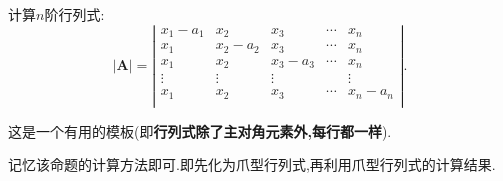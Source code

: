 \documentclass[../../main.tex]{subfiles}%
\begin{document}
\begin{corollary}\label{proposition:爪型行列式的推广}
计算$n$阶行列式:
\begin{equation}
|\boldsymbol{A}|=\left| \begin{matrix}
x_1-a_1&		x_2&		x_3&		\cdots&		x_n\\
x_1&		x_2-a_2&		x_3&		\cdots&		x_n\\
x_1&		x_2&		x_3-a_3&		\cdots&		x_n\\
\vdots&		\vdots&		\vdots&		&		\vdots\\
x_1&		x_2&		x_3&		\cdots&		x_n-a_n\\
\end{matrix} \right|.
\nonumber
\end{equation}
\end{corollary}
\begin{note}
这是一个有用的模板(即\textbf{行列式除了主对角元素外,每行都一样}).

记忆该命题的计算方法即可.即先化为爪型行列式,再利用爪型行列式的计算结果.
\end{note}
\end{document}
